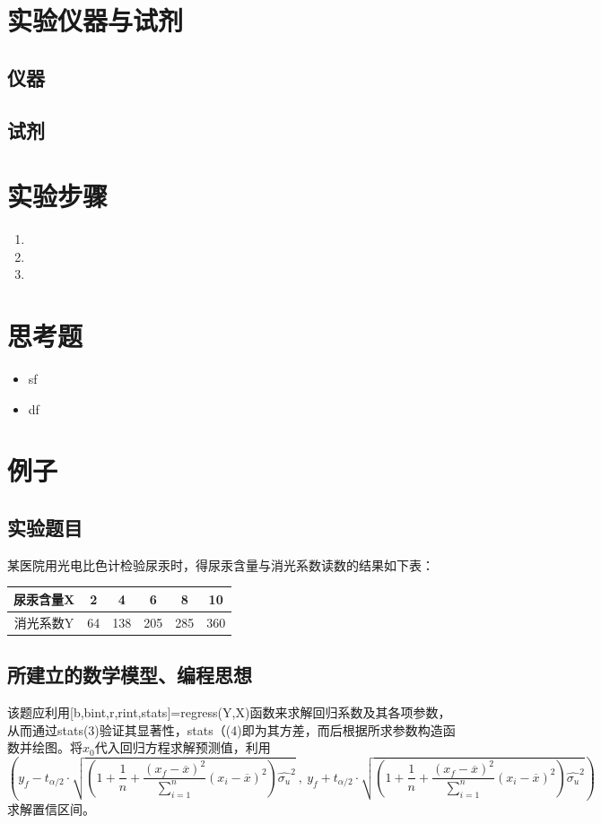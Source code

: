 \documentclass[UTF8,12pt,a4paper]{article}
\begin{document}
\section{实验仪器与试剂}
\subsection{仪器}
\subsection{试剂}

\section{实验步骤}
\begin{enumerate}
	\item 
	\item
	\item
\end{enumerate}

\section{思考题}
\begin{itemize}
	\item sf
	\item df
\end{itemize}

\section{例子}
\subsection{实验题目}
某医院用光电比色计检验尿汞时，得尿汞含量与消光系数读数的结果如下表：
\begin{table}[!h]
	\centering
	\begin{tabular}{cccccc}
		\toprule
		尿汞含量X & 2     & 4     & 6     & 8     & 10 \\
		\midrule
		消光系数Y & 64    & 138   & 205   & 285   & 360 \\
		\bottomrule
	\end{tabular}%
	\label{tab:exercise8_3}%
\end{table}%

\subsection{所建立的数学模型、编程思想}
该题应利用[b,bint,r,rint,stats]=regress(Y,X)函数来求解回归系数及其各项参数，从而通过stats(3)验证其显著性，stats（(4)即为其方差，而后根据所求参数构造函数并绘图。将$x_0$代入回归方程求解预测值，利用
\begin{equation*}
\scriptstyle\left(y_f-t_{\alpha/2}\cdot\sqrt{\left(1+\dfrac{1}{n}+\dfrac{{\left(x_f-\overline{x}\right)}^2}{\sum_{i=1}^{n}}{{(x_i-\overline{x})}^2}\right)\hat{\sigma_u}^2}\ ,\ y_f+t_{\alpha/2}\cdot\sqrt{\left(1+\dfrac{1}{n}+\dfrac{{\left(x_f-\overline{x}\right)}^2}{\sum_{i=1}^{n}}{{(x_i-\overline{x})}^2}\right)\hat{\sigma_u}^2}\right)
\end{equation*}
求解置信区间。
\end{document}
